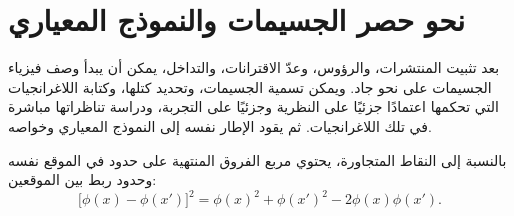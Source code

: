 \section{نحو حصر الجسيمات والنموذج المعياري}

بعد تثبيت المنتشرات، والرؤوس، وعدّ الاقترانات، والتداخل، يمكن أن يبدأ وصف فيزياء الجسيمات على نحو جاد. ويمكن تسمية الجسيمات، وتحديد كتلها، وكتابة اللاغرانجيات التي تحكمها اعتمادًا جزئيًا على النظرية وجزئيًا على التجربة، ودراسة تناظراتها مباشرة في تلك اللاغرانجيات. ثم يقود الإطار نفسه إلى النموذج المعياري وخواصه.

\begin{classroomqa}
\end{classroomqa}

\begin{classroomqa}
\end{classroomqa}

بالنسبة إلى النقاط المتجاورة، يحتوي مربع الفروق المنتهية على حدود في الموقع نفسه وحدود ربط بين الموقعين:
\begin{equation}
\bigl[\phi(x)-\phi(x')\bigr]^2
=
\phi(x)^2+\phi(x')^2-2\phi(x)\phi(x').
\end{equation}

\begin{classroomqa}
\end{classroomqa}